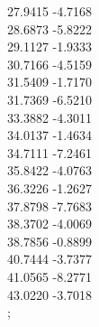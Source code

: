 {    27.9415	-4.7168\\
    28.6873	-5.8222\\
    29.1127	-1.9333\\
    30.7166	-4.5159\\
    31.5409	-1.7170\\
    31.7369	-6.5210\\
    33.3882	-4.3011\\
    34.0137	-1.4634\\
    34.7111	-7.2461\\
    35.8422	-4.0763\\
    36.3226	-1.2627\\
    37.8798	-7.7683\\
    38.3702	-4.0069\\
    38.7856	-0.8899\\
    40.7444	-3.7377\\
    41.0565	-8.2771\\
    43.0220	-3.7018\\
    };
